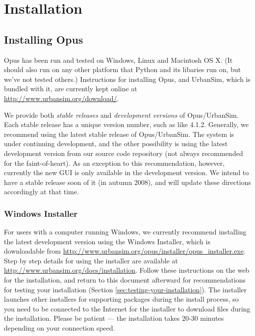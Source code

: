 
\chapter{Installation}
\label{appendix:installation}


\section{Installing Opus}

Opus has been run and tested on Windows, Linux and Macintosh OS X\@.  (It
should also run on any other platform that Python and its libaries run on,
but we've not tested others.)  Instructions for installing Opus, and
UrbanSim, which is bundled with it, are currently kept online at
\url{http://www.urbansim.org/download/}.

We provide both \emph{stable releases} and \emph{development versions} of
Opus/UrbanSim.  Each stable release has a unique version number, such as
like 4.1.2.  Generally, we recommend using the latest stable release of
Opus/UrbanSim.  The system is under continuing development, and the other
possibility is using the latest development version from our source code
repository (not always recommended for the faint-of-heart).  As an
exception to this recommendation, however, currently the new GUI is only
available in the development version.  We intend to have a stable release
soon of it (in autumn 2008), and will update these directions accordingly
at that time.

\subsection{Windows Installer}

For users with a computer running Windows, we currently recommend
installing the latest development version using the Windows Installer,
which is downloadable from
\url{http://www.urbansim.org/opus/installer/opus_installer.exe}.  Step by
step details for using the installer are available at
\url{http://www.urbansim.org/docs/installation}.  Follow these instructions
on the web for the installation, and return to this document afterward for
recommendations for testing your installation (Section
\ref{sec:testing-your-installation}).  The installer launches other
installers for supporting packages during the install process, so you need
to be connected to the Internet for the installer to download files during
the installation.  Please be patient --- the installation takes 20-30
minutes depending on your connection speed.

